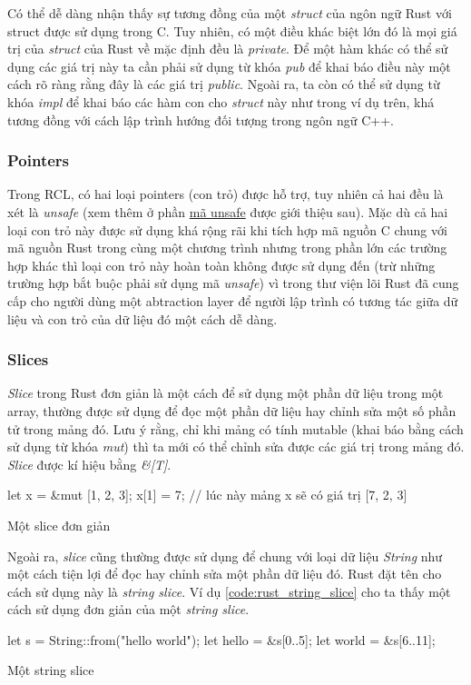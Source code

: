 Có thể dễ dàng nhận thấy sự tương đồng của một \emph{struct} của ngôn ngữ Rust với struct được sử dụng trong C.
Tuy nhiên, có một điều khác biệt lớn đó là mọi giá trị của \emph{struct} của Rust về mặc định đều là \emph{private}.
Để một hàm khác có thể sử dụng các giá trị này ta cần phải sử dụng từ khóa \emph{pub} để khai báo điều này một cách rõ ràng rằng đây là các giá trị \emph{public}.
Ngoài ra, ta còn có thể sử dụng từ khóa \emph{impl} để khai báo các hàm con cho \emph{struct} này như trong ví dụ trên, khá tương đồng với cách lập trình hướng đối tượng trong ngôn ngữ C++.

\subsubsection{Pointers}
Trong RCL, có hai loại pointers (con trỏ) được hỗ trợ, tuy nhiên cả hai đều là xét là \emph{unsafe} (xem thêm ở phần \hyperref[lbl:unsafe_code]{mã unsafe} được giới thiệu sau).
Mặc dù cả hai loại con trỏ này được sử dụng khá rộng rãi khi tích hợp mã nguồn C chung với mã nguồn Rust trong cùng một chương trình nhưng trong phần lớn các trường hợp khác thì loại con trỏ này hoàn toàn không được sử dụng đến (trừ những trường hợp bắt buộc phải sử dụng mã \emph{unsafe}) vì trong thư viện lõi Rust đã cung cấp cho người dùng một abtraction layer để người lập trình có tương tác giữa dữ liệu và con trỏ của dữ liệu đó một cách dễ dàng.

\subsubsection{Slices}
\emph{Slice} trong Rust đơn giản là một cách để sử dụng một phần dữ liệu trong một array, thường được sử dụng để đọc một phần dữ liệu hay chỉnh sửa một số phần tử trong mảng đó.
Lưu ý rằng, chỉ khi mảng có tính mutable (khai báo bằng cách sử dụng từ khóa \emph{mut}) thì ta mới có thể chỉnh sửa được các giá trị trong mảng đó.
\emph{Slice} được kí hiệu bằng \emph{\&[T]}.
\begin{listing}
\begin{rustcode}
let x = &mut [1, 2, 3];
x[1] = 7; // lúc này mảng x sẽ có giá trị [7, 2, 3]
\end{rustcode}
\caption{Một slice đơn giản}
\label{code:rust_slice_vector_example}
\end{listing}

Ngoài ra, \emph{slice} cũng thường được sử dụng để chung với loại dữ liệu \emph{String} như một cách tiện lợi để đọc hay chỉnh sửa một phần dữ liệu đó.
Rust đặt tên cho cách sử dụng này là \emph{string slice}.
Ví dụ \ref{code:rust_string_slice} cho ta thấy một cách sử dụng đơn giản của một \emph{string slice}.
\begin{listing}
\begin{rustcode}
let s = String::from("hello world");
let hello = &s[0..5];
let world = &s[6..11];
\end{rustcode}
\caption{Một string slice}
\label{code:rust_string_slice}
\end{listing}
